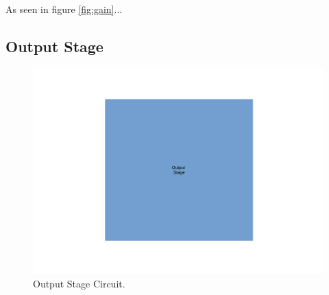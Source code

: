 As seen in figure \ref{fig:gain}...

\subsection{Output Stage}
\label{sec:output}

\begin{figure}[!ht] \centering
    \includegraphics[width=1\linewidth]{output.pdf}
    \caption{Output Stage Circuit.}
    \label{fig:output}
\end{figure}
\newpage




